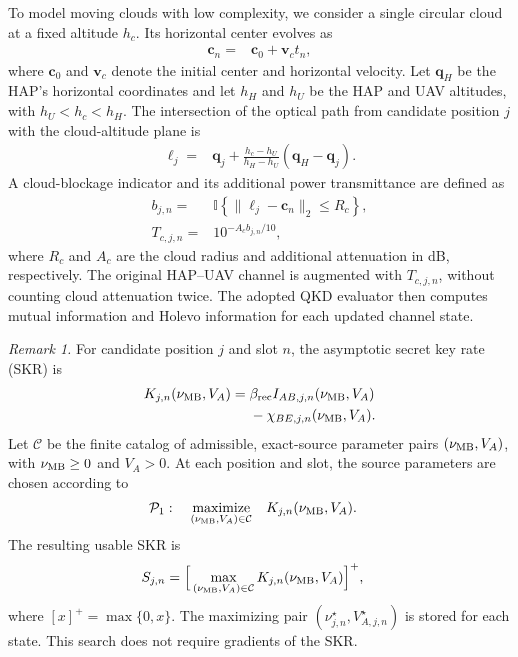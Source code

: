 \documentclass[conference,a4paper]{IEEEtran}
\begin{document}
To model moving clouds with low complexity, we consider a
single circular cloud at a fixed altitude $h_c$. Its
horizontal center evolves as
\begin{align}
\mathbf c_n
={}&\mathbf c_0+\mathbf v_c t_n,
\label{eq:availability_cloud_motion}
\end{align}
where $\mathbf c_0$ and $\mathbf v_c$ denote the initial center
and horizontal velocity. Let $\mathbf q_H$ be the HAP's
horizontal coordinates and let $h_H$ and $h_U$ be the HAP
and UAV altitudes, with $h_U<h_c<h_H$. The intersection
of the optical path from candidate position $j$ with the
cloud-altitude plane is
\begin{align}
\boldsymbol\ell_j
={}&\mathbf q_j+
\frac{h_c-h_U}{h_H-h_U}(\mathbf q_H-\mathbf q_j).
\label{eq:availability_cloud_intersection}
\end{align}
A cloud-blockage indicator and its additional power
transmittance are defined as
\begin{align}
b_{j,n}
={}&\mathbb I\!\left\{
\|\boldsymbol\ell_j-\mathbf c_n\|_2\leq R_c
\right\},
\label{eq:availability_blockage}
\\
T_{c,j,n}
={}&10^{-A_c b_{j,n}/10},
\label{eq:availability_cloud_transmittance}
\end{align}
where $R_c$ and $A_c$ are the cloud radius and additional
attenuation in dB, respectively. The original HAP--UAV
channel is augmented with $T_{c,j,n}$, without counting
cloud attenuation twice. The adopted QKD evaluator then
computes mutual information and Holevo information for
each updated channel state.

\noindent\textit{Remark 1.}
For candidate position $j$ and slot $n$, the asymptotic
secret key rate (SKR) is
\begin{align}
K_{j,n}(\nu_{\rm MB},V_A)
={}&\beta_{\rm rec}I_{AB,j,n}(\nu_{\rm MB},V_A)
\nonumber\\
&-\chi_{BE,j,n}(\nu_{\rm MB},V_A).
\label{eq:availability_skr}
\end{align}
Let $\mathcal C$ be the finite catalog of admissible,
exact-source parameter pairs $(\nu_{\rm MB},V_A)$, with
$\nu_{\rm MB}\geq0$ and $V_A>0$. At each position and
slot, the source parameters are chosen according to
\begin{align}
\mathcal P_1:\quad
\underset{(\nu_{\rm MB},V_A)\in\mathcal C}
{\operatorname{maximize}}\quad&
K_{j,n}(\nu_{\rm MB},V_A).
\label{eq:availability_source_optimization}
\end{align}
The resulting usable SKR is
\begin{align}
S_{j,n}
={}&\Big[\max_{(\nu_{\rm MB},V_A)\in\mathcal C}
K_{j,n}(\nu_{\rm MB},V_A)\Big]^+,
\label{eq:availability_usable_skr}
\end{align}
where $[x]^+=\max\{0,x\}$. The maximizing pair
$(\nu_{j,n}^{\star},V_{A,j,n}^{\star})$ is stored for each
state. This search does not require gradients of the SKR.
\end{document}
